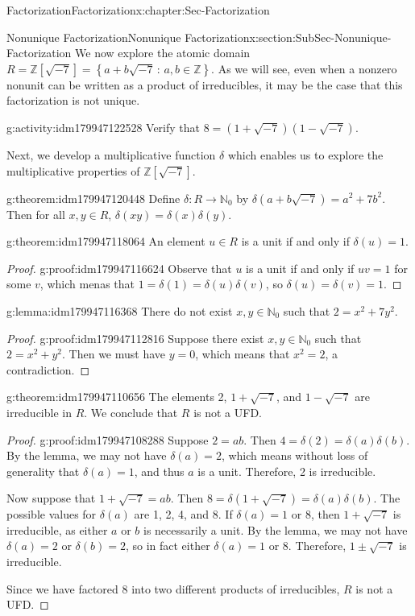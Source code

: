 \documentclass[oneside,10pt,]{book}
\numberwithin{equation}{section}
\newcommand{\setof}[2]{{\left\{#1\,\colon\,#2\right\}}}
\def\Z{{\mathbb Z}}
\def\N{{\mathbb N}}
\begin{document}
\begin{chapterptx}{Factorization}{}{Factorization}{}{}{x:chapter:Sec-Factorization}
\begin{sectionptx}{Nonunique Factorization}{}{Nonunique Factorization}{}{}{x:section:SubSec-Nonunique-Factorization}
We now explore the atomic domain \(R = \Z[\sqrt{-7}] = \setof{a+b\sqrt{-7}}{a,b\in\Z}\). As we will see, even when a nonzero nonunit can be written as a product of irreducibles, it may be the case that this factorization is not unique.%
\begin{activity}{}{g:activity:idm179947122528}%
Verify that \(8 = (1+\sqrt{-7})(1-\sqrt{-7})\).%
\end{activity}
Next, we develop a multiplicative function \(\delta\) which enables us to explore the multiplicative properties of \(\Z[\sqrt{-7}]\).%
\begin{theorem}{}{}{g:theorem:idm179947120448}%
Define \(\delta : R \to \N_0\) by \(\delta(a+b\sqrt{-7}) = a^2 + 7 b^2\). Then for all \(x,y\in R\), \(\delta(xy) = \delta(x)\delta(y)\).%
\end{theorem}
\begin{theorem}{}{}{g:theorem:idm179947118064}%
An element \(u\in R\) is a unit if and only if \(\delta(u) = 1\).%
\end{theorem}
\begin{proof}{}{g:proof:idm179947116624}
Observe that \(u\) is a unit if and only if \(uv = 1\) for some \(v\), which menas that \(1 = \delta(1) = \delta(u) \delta(v)\), so \(\delta(u) = \delta(v) = 1\).%
\end{proof}
\begin{lemma}{}{}{g:lemma:idm179947116368}%
There do not exist \(x,y\in \N_0\) such that \(2 = x^2 + 7y^2\).%
\end{lemma}
\begin{proof}{}{g:proof:idm179947112816}
Suppose there exist \(x,y\in \N_0\) such that \(2 = x^2 + y^2\). Then we must have \(y = 0\), which means that \(x^2 = 2\), a contradiction.%
\end{proof}
\begin{theorem}{}{}{g:theorem:idm179947110656}%
The elements 2, \(1+ \sqrt{-7}\), and \(1-\sqrt{-7}\) are irreducible in \(R\). We conclude that \(R\) is not a UFD.%
\end{theorem}
\begin{proof}{}{g:proof:idm179947108288}
Suppose \(2 = ab\). Then \(4 = \delta(2) = \delta(a)\delta(b)\). By the lemma, we may not have \(\delta(a) = 2\), which means without loss of generality that \(\delta(a) = 1\), and thus \(a\) is a unit. Therefore, 2 is irreducible.%
\par
Now suppose that \(1 + \sqrt{-7} = ab\). Then \(8 = \delta(1+\sqrt{-7}) = \delta(a) \delta(b)\). The possible values for \(\delta(a)\) are 1, 2, 4, and 8. If \(\delta(a) = 1\) or 8, then \(1+\sqrt{-7}\) is irreducible, as either \(a\) or \(b\) is necessarily a unit. By the lemma, we may not have \(\delta(a) = 2\) or \(\delta(b) = 2\), so in fact either \(\delta(a) = 1\) or 8. Therefore, \(1\pm \sqrt{-7}\) is irreducible.%
\par
Since we have factored 8 into two different products of irreducibles, \(R\) is not a UFD.%
\end{proof}
\end{sectionptx}
\end{chapterptx}
\end{document}
